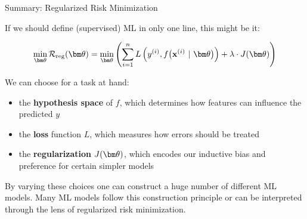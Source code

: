 \documentclass[11pt,compress,t,notes=noshow, xcolor=table]{beamer}
\begin{document}



\begin{vbframe}{Summary: Regularized Risk Minimization}

If we should define (supervised) ML in only one line, this might be it:

\[
\min_{\thetav} \riskrt= \min_{\thetav} \left(\sumin \Lxyit + \lambda \cdot J(\thetav) \right)
\]

We can choose for a task at hand:

\begin{itemize}
  \item the \textbf{hypothesis space} of $f$, which determines how features can 
  influence the predicted $y$
  \item the \textbf{loss} function $L$, which measures how errors should be treated
  \item the \textbf{regularization} $J(\thetav)$, which encodes our inductive 
  bias and preference for certain simpler models
\end{itemize}

\vfill

By varying these choices one can construct a huge number of different ML models. 
Many ML models follow this construction principle or can be interpreted through 
the lens of regularized risk minimization.

\end{vbframe}
\end{document}
